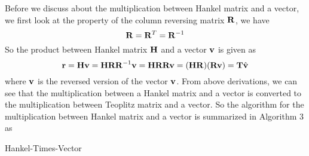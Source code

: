 \documentclass[revised,endfloat]{geophysics}
\DeclarePairedDelimiter\floor{\lfloor}{\rfloor}
\begin{document}
Before we discuss about the multiplication between Hankel matrix and a vector, we first look at the property of the column reversing matrix ${\bf R}$, we have 
\begin{equation}
{\bf R} = {\bf R}^T = {\bf R}^{-1}
\end{equation}
So the product between Hankel matrix ${\bf H}$ and a vector ${\bf v}$ is given as 
\begin{equation}
{\bf r} = {\bf Hv} = {\bf HRR}^{-1}{\bf v} = {\bf HRRv} = ({\bf HR})({\bf Rv}) = {\bf T} \hat {\bf v}
\end{equation}
where $\bf{v}$ is the reversed version of the vector ${\bf v}$. From above derivations, we can see that the multiplication between a Hankel matrix and a vector is converted to the multiplication between Teoplitz matrix and a vector. So the algorithm for the multiplication between Hankel matrix and a vector is summarized in Algorithm 3 as
\begin{algorithm}
      \SetAlgoLined
      \caption{Hankel-Times-Vector}
\end{algorithm}





\end{document}
